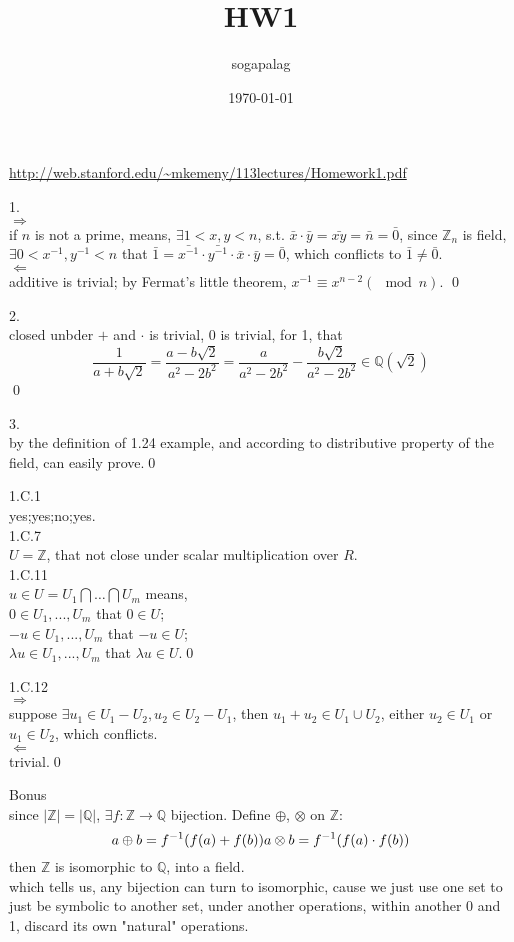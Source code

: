 \documentclass[paper=a4, fontsize=11pt]{scrartcl} %
\title{HW1}
\author{sogapalag}
\date{\normalsize\today}
\numberwithin{equation}{section} %
\numberwithin{figure}{section} %
\numberwithin{table}{section} %
\begin{document}
\maketitle 
\url{http://web.stanford.edu/~mkemeny/113lectures/Homework1.pdf}

1.\\
$\Rightarrow$\\
if $n$ is not a prime, means, $\exists 1<x,y<n$, s.t. $\bar{x}\cdot\bar{y} = \bar{xy} = \bar{n} = \bar{0}$, since $\mathbb{Z}_n$ is field, $\exists 0<x^{-1},y^{-1}<n$ that $\bar{1} = \bar{x^{-1}}\cdot\bar{y^{-1}}\cdot \bar{x}\cdot\bar{y} = \bar{0}$, which conflicts to $\bar{1}\neq \bar{0}$.\\
$\Leftarrow$\\
additive is trivial; by Fermat's little theorem, $x^{-1} \equiv x^{n-2} (\mod n)$. \qed

2.\\
closed unbder $+$ and $\cdot$ is trivial, 0 is trivial, for 1, that\\
\begin{equation}
\frac{1}{a+b\sqrt{2}} = \frac{a - b\sqrt{2}}{a^2 - 2b^2} = \frac{a}{a^2 - 2b^2}  - \frac{b\sqrt{2}}{a^2 - 2b^2} \in \mathbb{Q}(\sqrt{2})
\end{equation}\qed

3.\\
by the definition of 1.24 example, and according to distributive property of the field, can easily prove.\qed

1.C.1\\
yes;yes;no;yes.\\
1.C.7\\
$U=\mathbb{Z}$, that not close under scalar multiplication over $R$.\\
1.C.11\\
$u\in U = U_1\bigcap\dots\bigcap U_m$ means,\\
$0\in U_1,...,U_m$ that $0\in U$;\\
$-u\in U_1,...,U_m$ that $-u\in U$;\\
$\lambda u\in U_1,...,U_m$ that $\lambda u\in U$.\qed

1.C.12\\
$\Rightarrow$\\
suppose $\exists u_1\in U_1 - U_2, u_2\in U_2 -U_1$, then $u_1+u_2\in U_1\cup U_2$, either $u_2\in U_1$ or $u_1\in U_2$, which conflicts.\\
$\Leftarrow$\\
trivial.\qed

Bonus\\
since $|\mathbb{Z}| = |\mathbb{Q}|$, $\exists f: \mathbb{Z}\rightarrow\mathbb{Q}$ bijection. Define $\oplus$, $\otimes$ on $\mathbb{Z}$:
\begin{equation}
	a\oplus b = f^{-1}(f(a)+f(b))\\
	a\otimes b = f^{-1}(f(a)\cdot f(b))
\end{equation}
then $\mathbb{Z}$ is isomorphic to $\mathbb{Q}$, into a field.\\
which tells us, any bijection can turn to isomorphic, cause we just use one set to just be symbolic to another set, under another operations, within another 0 and 1, discard its own "natural" operations. 
\end{document}
